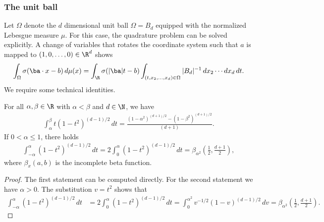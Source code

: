 \documentclass{amsart}[11pt]
\numberwithin{equation}{section}
\numberwithin{theorem}{section}
\begin{document}
\subsubsection{The unit ball}
Let $\Omega$ denote the $d$ dimensional unit ball $\Omega= B_d$ equipped with the normalized Lebesgue measure $\mu$. For this case, the quadrature problem can be solved explicitly. A change of variables that rotates the coordinate system such that $a$ is mapped to $(1,0,\ldots,0)\in\R^d$ shows 
    \begin{align}\label{eq:coarea}
        \int_\Omega \sigma(\ba \cdot x - b) \, d\mu(x) = \int_\R \sigma(|\ba|t - b) \int_{(t,x_2,\ldots,x_d)\in\Omega} |B_d|^{-1} \, dx_2 \cdots dx_d \, dt.
    \end{align} 
We require some technical identities.
\begin{lemma}\label{lem:auxiliary_integral}
    For all $\alpha, \beta \in \R$ with $\alpha < \beta$ and $d \in \N$, we have
    \begin{align*}
        \int_\alpha^\beta t(1 - t^2)^{(d-1)/2} \, dt = \frac{(1 - \alpha^2)^{(d+1)/2} - (1 - \beta^2)^{(d+1)/2}}{(d + 1)}.
    \end{align*}
    If $0< \alpha \leq 1$, there holds
    \begin{align*}
        \int_{-\alpha}^\alpha (1 - t^2)^{(d-1)/2} \, dt = 2 \int_0^\alpha (1 - t^2)^{(d-1)/2} \, dt = \beta_{\alpha^2}\left(\frac{1}{2}, \frac{d + 1}{2}\right),
    \end{align*}
    where $\beta_x(a, b)$ is the incomplete beta function.
\end{lemma}
\begin{proof}
    The first statement can be computed directly. For the second statement we have $\alpha > 0$. The substitution $v = t^2$ shows that
    \begin{align*}
        \int_{-\alpha}^\alpha (1 - t^2)^{(d-1)/2} \, dt &= 2 \int_0^\alpha (1 - t^2)^{(d-1)/2} \, dt = \int_0^{\alpha^2} v^{-1/2} (1 - v)^{(d-1)/2}  \, dv = \beta_{\alpha^2}\left(\frac{1}{2}, \frac{d + 1}{2}\right).
    \end{align*}
\end{proof}
\end{document}
